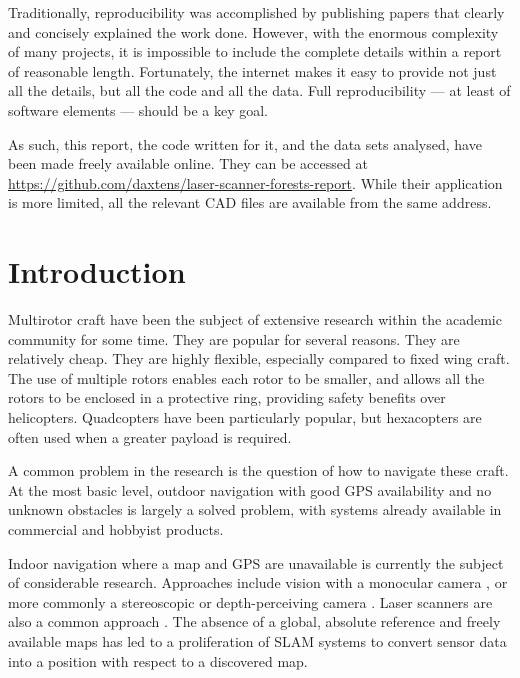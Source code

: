 \documentclass[12pt,oneside,a4paper]{book}
\begin{document}
Traditionally, reproducibility was accomplished by publishing papers
that clearly and concisely explained the work done. However, with the
enormous complexity of many projects, it is impossible to include the
complete details within a report of reasonable length. Fortunately,
the internet makes it easy to provide not just all the details, but
all the code and all the data. Full reproducibility --- at least of
software elements --- should be a key goal.

As such, this report, the code written for it, and the data sets
analysed, have been made freely available online. They can be accessed
at \url{https://github.com/daxtens/laser-scanner-forests-report}.
While their application is more limited, all the relevant CAD files
are available from the same address.



\chapter{Introduction}
\label{cha:intro}


Multirotor craft have been the subject of extensive research within
the academic community for some time. They are popular for several
reasons. They are relatively cheap. They are highly flexible,
especially compared to fixed wing craft. The use of multiple rotors
enables each rotor to be smaller, and allows all the rotors to be
enclosed in a protective ring, providing safety benefits over
helicopters. Quadcopters have been particularly popular, but
hexacopters are often used when a greater payload is required.

A common problem in the research is the question of how to navigate
these craft. At the most basic level, outdoor navigation with good GPS
availability and no unknown obstacles is largely a solved problem,
with systems already available in commercial and hobbyist products.

Indoor navigation where a map and GPS are unavailable is currently the
subject of considerable research. Approaches include vision with a
monocular camera \cite{5152680}, or more commonly a stereoscopic or
depth-perceiving camera \cite{huang2011visual}. Laser scanners are
also a common approach \cite{achtelik2009stereo}. The absence of a
global, absolute reference and freely available maps has led to a
proliferation of \gls{SLAM} systems to convert sensor data into a
position with respect to a discovered map.
\end{document}

